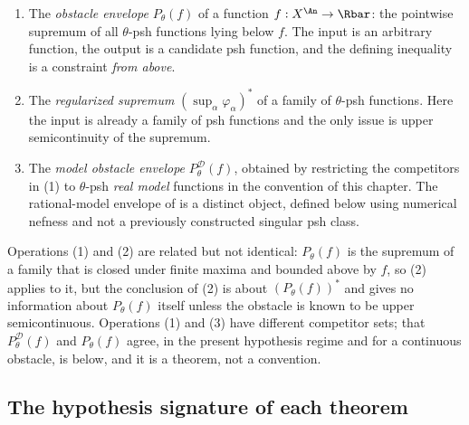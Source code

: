 \begin{enumerate}
\item The \emph{obstacle envelope} \(P_\theta(f)\) of a function
\(f:X^{\An}\to\Rbar\): the pointwise supremum of all \(\theta\)-psh
functions lying below \(f\).  The input is an arbitrary function, the output
is a candidate psh function, and the defining inequality is a constraint
\emph{from above}.
\item The \emph{regularized supremum} \((\sup_\alpha\varphi_\alpha)^*\) of a
family of \(\theta\)-psh functions.  Here the input is already a family of
psh functions and the only issue is upper semicontinuity of the supremum.
\item The \emph{model obstacle envelope} \(P^{\mathcal D}_\theta(f)\),
obtained by restricting the competitors in (1) to \(\theta\)-psh
\emph{real model} functions in the convention of this chapter.
The rational-model envelope of
\cite[Definition~2.8]{GJKM19} is a distinct object, defined below using
numerical nefness and not a previously constructed singular psh class.
\end{enumerate}

Operations (1) and (2) are related but not identical: \(P_\theta(f)\) is the
supremum of a family that is closed under finite maxima and bounded above by
\(f\), so (2) applies to it, but the conclusion of (2) is about
\((P_\theta(f))^*\) and gives no information about \(P_\theta(f)\) itself
unless the obstacle is known to be upper semicontinuous.  Operations (1) and
(3) have different competitor sets; that
\(P^{\mathcal D}_\theta(f)\) and \(P_\theta(f)\) agree, in the present
hypothesis regime and for a continuous obstacle, is
 below, and it is a theorem, not a
convention.

\begin{center}
\end{center}

\subsection{The hypothesis signature of each theorem}
\label{sec:ch23-signature}

